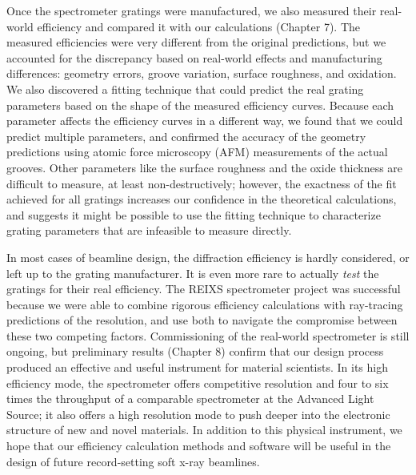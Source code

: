 \documentclass[12pt,bound,twoside,openright,final]{uofsthesis-cs}
\begin{document}
Once the spectrometer gratings were manufactured, we also measured their real-world efficiency and compared it with our calculations (Chapter 7).  The measured efficiencies were very different from the original predictions, but we accounted for the discrepancy based on real-world effects and manufacturing differences: geometry errors, groove variation, surface roughness, and oxidation.  We also discovered a fitting technique that could predict the real grating parameters based on the shape of the measured efficiency curves.  Because each parameter affects the efficiency curves in a different way, we found that we could predict multiple parameters, and confirmed the accuracy of the geometry predictions using atomic force microscopy (AFM) measurements of the actual grooves.  Other parameters like the surface roughness and the oxide thickness are difficult to measure, at least non-destructively; however, the exactness of the fit achieved for all gratings increases our confidence in the theoretical calculations, and suggests it might be possible to use the fitting technique to characterize grating parameters that are infeasible to measure directly.

In most cases of beamline design, the diffraction efficiency is hardly considered, or left up to the grating manufacturer.  It is even more rare to actually {\emph{test}} the gratings for their real efficiency.  The REIXS spectrometer project was successful because we were able to combine rigorous efficiency calculations with ray-tracing predictions of the resolution, and use both to navigate the compromise between these two competing factors.  Commissioning of the real-world spectrometer is still ongoing, but preliminary results (Chapter 8) confirm that our design process produced an effective and useful instrument for material scientists.  In its high efficiency mode, the spectrometer offers competitive resolution and four to six times the throughput of a comparable spectrometer at the Advanced Light Source; it also offers a high resolution mode to push deeper into the electronic structure of new and novel materials.  In addition to this physical instrument, we hope that our efficiency calculation methods and software will be useful in the design of future record-setting soft x-ray beamlines.

%







\end{document}
